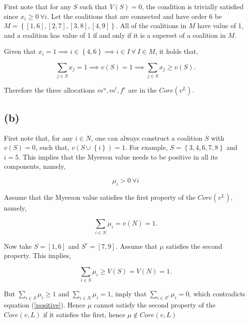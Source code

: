 \documentclass[american]{scrartcl}
\newcommand{\set}[1]{\left\{#1\right\}}
\begin{document}
First note that for any $S$ such that $V(S) = 0$, the condition is trivially satisfied since $x_i \geq 0 \ \forall i$. Let the coalitions that are connected and have order 6 be $M = \set{[1, 6], [2, 7], [3, 8], [4, 9]}$. All of the coalitions in $M$ have value of 1, and a coalition has value of 1 if and only if it is a superset of a coalition in $M$.

Given that $x_i = 1 \implies i \in \set{4, 6} \implies i \in I \  \forall \ I \in M$, it holds that,

\begin{equation}
    \sum_{j \in S} x_j = 1 \implies v(S) = 1 \implies \sum_{j \in S} x_j \geq v(S).
\end{equation}

Therefore the three allocations $m^u, m^l, f^e$ are in the $Core(v^L)$.

\subsection*{(b)}

First note that, for any $i \in N$, one can always construct a coalition $S$ with $v(S) = 0$, such that, $v(S \cup \set{i}) = 1$. For example, $S = \set{3, 4, 6, 7, 8}$ and $i = 5$. This implies that the Myerson value needs to be positive in all its components, namely,

\begin{equation} \label{positive}
    \mu_i > 0 \ \forall i
\end{equation}

Assume that the Myerson value satisfies the first property of the $Core(v^L)$, namely,

\begin{equation}
    \sum_{i \in N} \mu_i = v(N) = 1.
\end{equation}

Now take $S = [1, 6]$ and $S^c = [7, 9]$. Assume that $\mu$ satisfies the second property. This implies,

\begin{equation}
    \sum_{i \in S}\mu_i \geq V(S) = V(N) = 1.
\end{equation}

But $\sum_{i \in S}\mu_i \geq 1$ and $\sum_{i \in N}\mu_i = 1$, imply that $\sum_{i \in S^c}\mu_i = 0$, which contradicts equation (\ref{positive}). Hence $\mu$ cannot satisfy the second property of the $Core(v, L)$ if it satisfies the first, hence $\mu \notin Core(v, L)$
\end{document}
